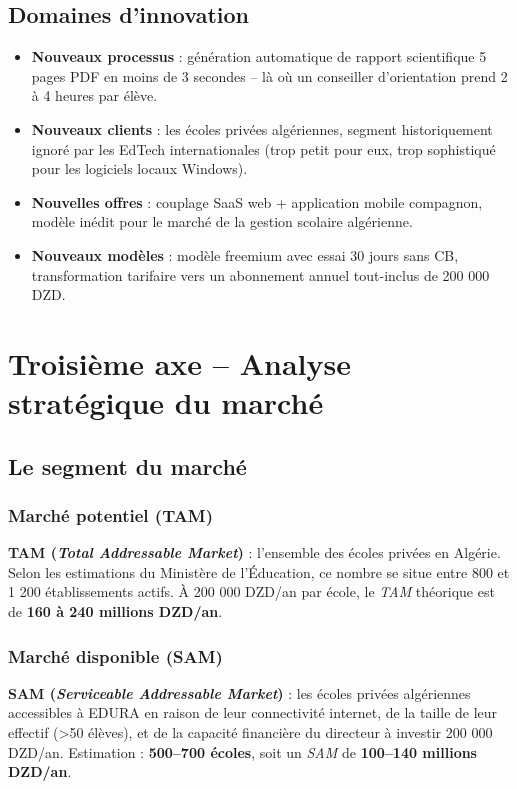 \documentclass[12pt,a4paper,oneside]{report}
\begin{document}
\subsection{Domaines d'innovation}

\begin{itemize}
  \item \textbf{Nouveaux processus} : génération automatique de rapport scientifique 5 pages PDF en moins de 3 secondes -- là où un conseiller d'orientation prend 2 à 4 heures par élève.
  \item \textbf{Nouveaux clients} : les écoles privées algériennes, segment historiquement ignoré par les EdTech internationales (trop petit pour eux, trop sophistiqué pour les logiciels locaux Windows).
  \item \textbf{Nouvelles offres} : couplage SaaS web + application mobile compagnon, modèle inédit pour le marché de la gestion scolaire algérienne.
  \item \textbf{Nouveaux modèles} : modèle freemium avec essai 30 jours sans CB, transformation tarifaire vers un abonnement annuel tout-inclus de 200 000 DZD.
\end{itemize}

\section{Troisième axe -- Analyse stratégique du marché}

\subsection{Le segment du marché}

\subsubsection{Marché potentiel (TAM)}

\textbf{TAM (\textit{Total Addressable Market})} : l'ensemble des écoles privées en Algérie. Selon les estimations du Ministère de l'Éducation, ce nombre se situe entre 800 et 1 200 établissements actifs. À 200 000 DZD/an par école, le \textit{TAM} théorique est de \textbf{160 à 240 millions DZD/an}.

\subsubsection{Marché disponible (SAM)}

\textbf{SAM (\textit{Serviceable Addressable Market})} : les écoles privées algériennes accessibles à EDURA en raison de leur connectivité internet, de la taille de leur effectif (>50 élèves), et de la capacité financière du directeur à investir 200 000 DZD/an. Estimation : \textbf{500--700 écoles}, soit un \textit{SAM} de \textbf{100--140 millions DZD/an}.
\end{document}
